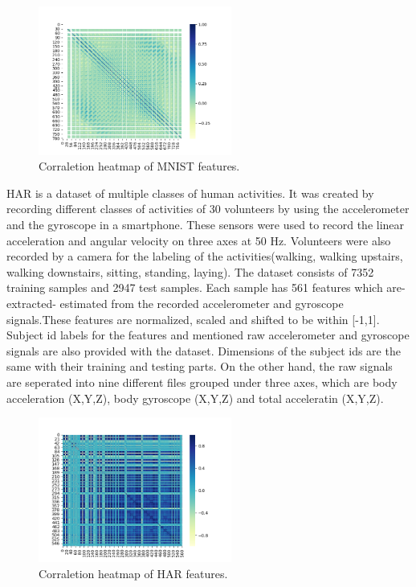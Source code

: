 \documentclass[journal]{IEEEtran}
\begin{document}
\begin{figure}[!ht]
\centering
\includegraphics[width=2.5in]{images/cor_heat_mnist.png}
\caption{Corraletion heatmap of MNIST features.}
\label{fig_mnist}
\end{figure}

HAR is a dataset of multiple classes of human activities. It was created by recording different classes of activities of 30 volunteers
by using the accelerometer and the gyroscope in a smartphone. These sensors were used to record the linear acceleration and angular velocity
on three axes at 50 Hz. Volunteers were also recorded by a camera for the labeling of the activities(walking, walking upstairs, walking downstairs, sitting, standing, laying)\cite{anguita2013public}. The dataset consists of 7352
training samples and 2947 test samples. Each sample has 561 features which are- extracted- estimated from the recorded accelerometer and gyroscope signals.These features are normalized, scaled and shifted to be within [-1,1].  Subject id labels for the features and mentioned raw accelerometer and gyroscope signals are also provided with the dataset.
Dimensions of the subject ids are the same with their training and testing parts. On the other hand, the raw signals are seperated into nine different files grouped under three axes, which are body acceleration (X,Y,Z), body gyroscope (X,Y,Z) and total acceleratin (X,Y,Z).

\begin{figure}[!ht]
  \centering
  \includegraphics[width=2.5in]{images/cor_heat_har.png}
  \caption{Corraletion heatmap of HAR features.}
  \label{fig_har}
  \end{figure}
  \par
  
\end{document}
